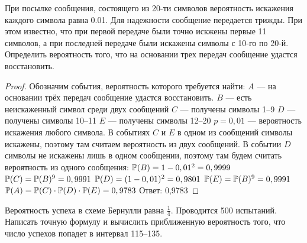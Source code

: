\begin{problem}
	При посылке сообщения, состоящего из 20-ти символов вероятность искажения каждого символа равна 0.01. Для надежности сообщение передается трижды. При этом известно, что при первой передаче были точно искжены первые 11 символов, а при последней передаче были искажены символы с 10-го по 20-й. Определить вероятность того, что на основании трех передач сообщение удастся восстановить.  
\end{problem}

\begin{proof}
	Обозначим события, вероятность которого требуется найти: 
 $A$ --– на основании трёх передач сообщение удастся восстановить.\newline
 $B$ --- есть неискаженный символ среди двух сообщений\newline
 $C$ --- получены символы 1--9\newline
 $D$ --- получены символы 10--11\newline
 $E$ --- получены символы 12--20\newline
 $p = 0,01$ --- вероятность искажения любого символа.\newline
 В событиях $C$ и $E$ в одном из сообщений символы искажены, поэтому там считаем вероятность из двух сообщений. В событии $D$ символы не искажены лишь в одном сообщении, поэтому там будем считать вероятность из одного сообщения:\newline
 $\mathbb{P}(B) = 1 - 0,01^2 = 0,9999\newline$
 $\mathbb{P}(C) =\mathbb{P}(B)^9 = 0,9991\newline$
 $\mathbb{P}(D) = (1 - 0,01)^2 = 0,9801\newline$
 $\mathbb{P}(E) = \mathbb{P}(B)^9 = 0,9991\newline$
 $\mathbb{P}(A) = \mathbb{P}(C) \cdot \mathbb{P}(D) \cdot \mathbb{P}(E) = 0,9783 \newline$
 \newline
 Ответ: 0,9783
\end{proof}

\begin{problem}
	Вероятность успеха в схеме Бернулли равна $\frac{1}{4}$. Проводится 500 испытаний. Написать точную формулу и вычислить приближенную вероятность того, что число успехов попадет в интервал 115--135. 
\end{problem}

